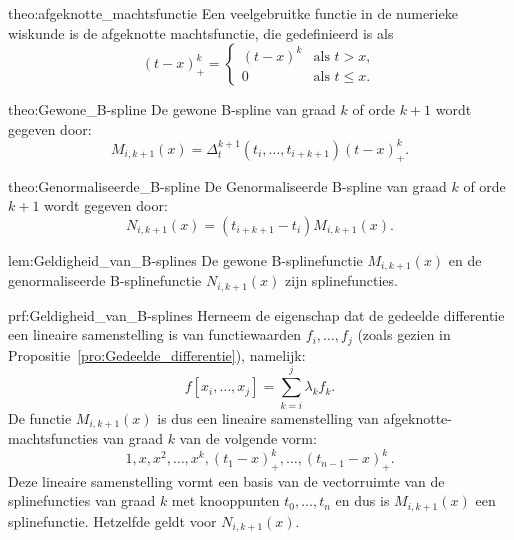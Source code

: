 \begin{theo}{theo:afgeknotte_machtsfunctie}
    Een veelgebruitke functie in de numerieke wiskunde is de afgeknotte machtsfunctie, die gedefinieerd is als
    \begin{equation*}
        (t-x)^k_+ = \begin{cases}
            (t-x)^k & \text{als } t > x, \\
            0 & \text{als } t \leq x.
        \end{cases}
    \end{equation*}    
\end{theo}

\begin{theo}{theo:Gewone_B-spline}
    De gewone B-spline van graad $k$ of orde $k+1$ wordt gegeven door:
    \begin{equation*}
        M_{i,k+1}(x) = \Delta_t^{k+1}(t_i,\ldots,t_{i+k+1}) (t-x)^k_+.
    \end{equation*}
    \vspace{-0.3cm}
\end{theo}

\begin{theo}{theo:Genormaliseerde_B-spline}
    De Genormaliseerde B-spline van graad $k$ of orde $k+1$ wordt gegeven door:
    \begin{equation*}
        N_{i,k+1}(x) = (t_{i+k+1} - t_i) M_{i,k+1}(x).
    \end{equation*}
    \vspace{-0.3cm}
\end{theo}

\begin{lem}{lem:Geldigheid_van_B-splines}
    De gewone B-splinefunctie $M_{i,k+1}(x)$ en de genormaliseerde B-splinefunctie $N_{i,k+1}(x)$ zijn splinefuncties.
\end{lem}

\begin{prf}{prf:Geldigheid_van_B-splines}
    Herneem de eigenschap dat de gedeelde differentie een lineaire samenstelling is van functiewaarden $f_i,\ldots,f_j$ (zoals gezien in Propositie~\ref{pro:Gedeelde_differentie}), namelijk:
    \begin{equation*}
        f[x_i,\ldots,x_j] = \sum_{k=i}^{j} \lambda_k f_k.
    \end{equation*}
    De functie $M_{i,k+1}(x)$ is dus een lineaire samenstelling van afgeknotte-machtsfuncties van graad $k$ van de volgende vorm:
    \begin{equation*}
        1, x, x^2, \ldots, x^k, (t_1 - x)^k_+, \ldots, (t_{n-1} - x)^k_+.
    \end{equation*}
    Deze lineaire samenstelling vormt een basis van de vectorruimte van de splinefuncties van graad $k$ met knooppunten $t_0,\ldots,t_n$ en dus is $M_{i,k+1}(x)$ een splinefunctie. Hetzelfde geldt voor $N_{i,k+1}(x)$.
\end{prf}

